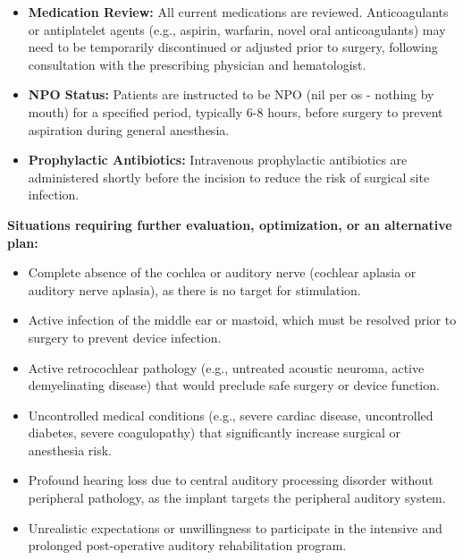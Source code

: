\begin{itemize}
  \item \textbf{Medication Review:} All current medications are reviewed. Anticoagulants or antiplatelet agents (e.g., aspirin, warfarin, novel oral anticoagulants) may need to be temporarily discontinued or adjusted prior to surgery, following consultation with the prescribing physician and hematologist.
  \item \textbf{NPO Status:} Patients are instructed to be NPO (nil per os - nothing by mouth) for a specified period, typically 6-8 hours, before surgery to prevent aspiration during general anesthesia.
  \item \textbf{Prophylactic Antibiotics:} Intravenous prophylactic antibiotics are administered shortly before the incision to reduce the risk of surgical site infection.
\end{itemize}

\textbf{Situations requiring further evaluation, optimization, or an alternative plan:}
\begin{itemize}
  \item Complete absence of the cochlea or auditory nerve (cochlear aplasia or auditory nerve aplasia), as there is no target for stimulation.
  \item Active infection of the middle ear or mastoid, which must be resolved prior to surgery to prevent device infection.
  \item Active retrocochlear pathology (e.g., untreated acoustic neuroma, active demyelinating disease) that would preclude safe surgery or device function.
  \item Uncontrolled medical conditions (e.g., severe cardiac disease, uncontrolled diabetes, severe coagulopathy) that significantly increase surgical or anesthesia risk.
  \item Profound hearing loss due to central auditory processing disorder without peripheral pathology, as the implant targets the peripheral auditory system.
  \item Unrealistic expectations or unwillingness to participate in the intensive and prolonged post-operative auditory rehabilitation program.
\end{itemize}

